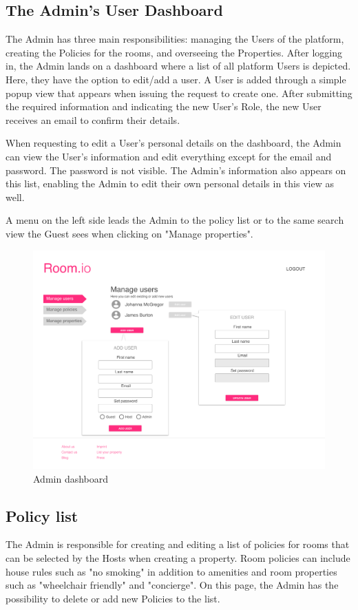 \subsection{The Admin's User Dashboard} \label{admindashboard_section}
The Admin has three main responsibilities: managing the Users of the platform, creating the Policies for the rooms, and overseeing the Properties. After logging in, the Admin lands on a dashboard where a list of all platform Users is depicted. Here, they have the option to edit/add a user. A User is added through a simple popup view that appears when issuing the request to create one. After submitting the required information and indicating the new User's Role, the new User receives an email to confirm their details.

When requesting to edit a User's personal details on the dashboard, the Admin can view the User's information and edit everything except for the email and password. The password is not visible. The Admin's information also appears on this list, enabling the Admin to edit their own personal details in this view as well.

A menu on the left side leads the Admin to the policy list or to the same search view the Guest sees when clicking on "Manage properties".

\begin{figure}[H]
  \centering
  \includegraphics[width=\textwidth]{img/mockups/admin_dashboard.pdf}
  \caption{Admin dashboard}
  \label{admin_dashboard}
\end{figure}

\subsection{Policy list}
The Admin is responsible for creating and editing a list of policies for rooms that can be selected by the Hosts when creating a property. Room policies can include house rules such as "no smoking" in addition to amenities and room properties such as "wheelchair friendly" and "concierge". On this page, the Admin has the possibility to delete or add new Policies to the list.

